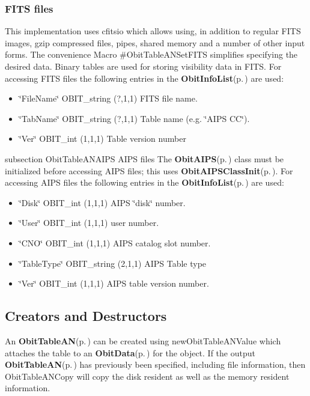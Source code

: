 \subsubsection{FITS files}\label{ObitTableWX_8h_TableFITS}
This implementation uses cfitsio which allows using, in addition to regular FITS images, gzip compressed files, pipes, shared memory and a number of other input forms. The convenience Macro \#Obit\-Table\-ANSet\-FITS simplifies specifying the desired data. Binary tables are used for storing visibility data in FITS. For accessing FITS files the following entries in the {\bf Obit\-Info\-List}{\rm (p.\,\pageref{structObitInfoList})} are used: \begin{itemize}
\item \char`\"{}File\-Name\char`\"{} OBIT\_\-string (?,1,1) FITS file name. \item \char`\"{}Tab\-Name\char`\"{} OBIT\_\-string (?,1,1) Table name (e.g. \char`\"{}AIPS CC\char`\"{}). \item \char`\"{}Ver\char`\"{} OBIT\_\-int (1,1,1) Table version number\end{itemize}
subsection Obit\-Table\-ANAIPS AIPS files The {\bf Obit\-AIPS}{\rm (p.\,\pageref{structObitAIPS})} class must be initialized before accessing AIPS files; this uses {\bf Obit\-AIPSClass\-Init}{\rm (p.\,\pageref{ObitAIPS_8c_a5})}. For accessing AIPS files the following entries in the {\bf Obit\-Info\-List}{\rm (p.\,\pageref{structObitInfoList})} are used: \begin{itemize}
\item \char`\"{}Disk\char`\"{} OBIT\_\-int (1,1,1) AIPS \char`\"{}disk\char`\"{} number. \item \char`\"{}User\char`\"{} OBIT\_\-int (1,1,1) user number. \item \char`\"{}CNO\char`\"{} OBIT\_\-int (1,1,1) AIPS catalog slot number. \item \char`\"{}Table\-Type\char`\"{} OBIT\_\-string (2,1,1) AIPS Table type \item \char`\"{}Ver\char`\"{} OBIT\_\-int (1,1,1) AIPS table version number.\end{itemize}
\subsection{Creators and Destructors}\label{ObitTableAN_8h_ObitTableANaccess}
An {\bf Obit\-Table\-AN}{\rm (p.\,\pageref{structObitTableAN})} can be created using new\-Obit\-Table\-ANValue which attaches the table to an {\bf Obit\-Data}{\rm (p.\,\pageref{structObitData})} for the object. If the output {\bf Obit\-Table\-AN}{\rm (p.\,\pageref{structObitTableAN})} has previously been specified, including file information, then Obit\-Table\-ANCopy will copy the disk resident as well as the memory resident information.

